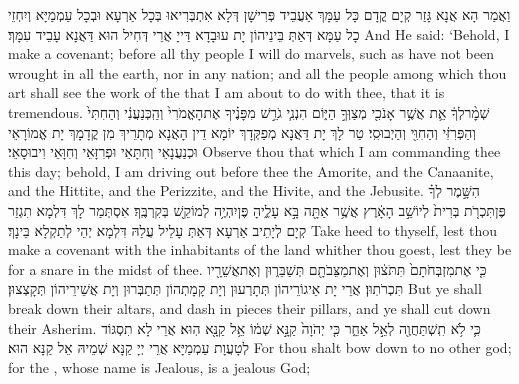 {וַאֲמַר הָא אֲנָא גָּזַר קְיָם קֳדָם כָּל עַמָּךְ אַעֲבֵיד פְּרִישָׁן דְּלָא אִתְבְּרִיאוּ בְּכָל אַרְעָא וּבְכָל עַמְמַיָּא וְיִחְזֵי כָל עַמָּא דְּאַתְּ בֵּינֵיהוֹן יָת עוּבָדָא דַּייָ אֲרֵי דְּחִיל הוּא דַּאֲנָא עָבֵיד עִמָּךְ׃}
{And He said: ‘Behold, I make a covenant; before all thy people I will do marvels, such as have not been wrought in all the earth, nor in any nation; and all the people among which thou art shall see the work of the \lord\space that I am about to do with thee, that it is tremendous.}{}
{שְׁמׇ֨ר\maqqaf לְךָ֔ אֵ֛ת אֲשֶׁ֥ר אָנֹכִ֖י מְצַוְּךָ֣ הַיּ֑וֹם הִנְנִ֧י גֹרֵ֣שׁ מִפָּנֶ֗יךָ אֶת\maqqaf הָאֱמֹרִי֙ וְהַֽכְּנַעֲנִ֔י וְהַחִתִּי֙ וְהַפְּרִזִּ֔י וְהַחִוִּ֖י וְהַיְבוּסִֽי׃}
{טַר לָךְ יָת דַּאֲנָא מְפַקְּדָךְ יוֹמָא דֵין הָאֲנָא מְתָרֵיךְ מִן קֳדָמָךְ יָת אֱמוֹרָאֵי וּכְנַעֲנָאֵי וְחִתָּאֵי וּפְרִזָּאֵי וְחִוָּאֵי וִיבוּסָאֵי׃}
{Observe thou that which I am commanding thee this day; behold, I am driving out before thee the Amorite, and the Canaanite, and the Hittite, and the Perizzite, and the Hivite, and the Jebusite.}{}
{הִשָּׁ֣מֶר לְךָ֗ פֶּן\maqqaf תִּכְרֹ֤ת בְּרִית֙ לְיוֹשֵׁ֣ב הָאָ֔רֶץ אֲשֶׁ֥ר אַתָּ֖ה בָּ֣א עָלֶ֑יהָ פֶּן\maqqaf יִהְיֶ֥ה לְמוֹקֵ֖שׁ בְּקִרְבֶּֽךָ׃}
{אִסְתְּמַר לָךְ דִּלְמָא תִגְזַר קְיָם לְיָתֵיב אַרְעָא דְּאַתְּ עָלֵיל עֲלַהּ דִּלְמָא יְהֵי לְתַקְלָא בֵּינָךְ׃}
{Take heed to thyself, lest thou make a covenant with the inhabitants of the land whither thou goest, lest they be for a snare in the midst of thee.}{}
{כִּ֤י אֶת\maqqaf מִזְבְּחֹתָם֙ תִּתֹּצ֔וּן וְאֶת\maqqaf מַצֵּבֹתָ֖ם תְּשַׁבֵּר֑וּן וְאֶת\maqqaf אֲשֵׁרָ֖יו תִּכְרֹתֽוּן׃}
{אֲרֵי יָת אֵיגוֹרֵיהוֹן תְּתָרְעוּן וְיָת קָמָתְהוֹן תְּתַבְּרוּן וְיָת אֲשֵׁירֵיהוֹן תְּקָצְצוּן׃}
{But ye shall break down their altars, and dash in pieces their pillars, and ye shall cut down their Asherim.}{}
{כִּ֛י לֹ֥א תִֽשְׁתַּחֲוֶ֖ה לְאֵ֣ל אַחֵ֑\large{ר} כִּ֤י יְהֹוָה֙ קַנָּ֣א שְׁמ֔וֹ אֵ֥ל קַנָּ֖א הֽוּא׃}
{אֲרֵי לָא תִסְגּוֹד לְטָעֲוָת עַמְמַיָּא אֲרֵי יְיָ קַנָּא שְׁמֵיהּ אֵל קַנָּא הוּא׃}
{For thou shalt bow down to no other god; for the \lord, whose name is Jealous, is a jealous God;}{}
